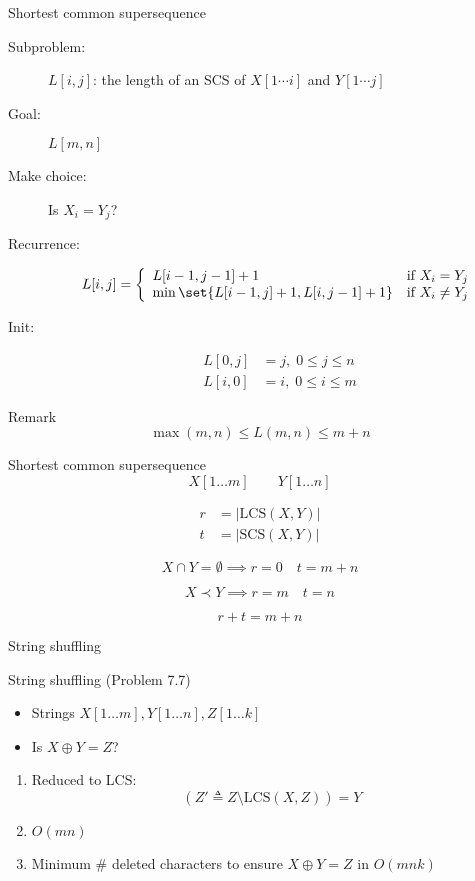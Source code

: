 \begin{frame}{Shortest common supersequence}
  \begin{description}
	\item[Subproblem:] $L[i,j]$: the length of an SCS of $X[1 \cdots i]$ and $Y[1 \cdots j]$
	\item[Goal:] $L[m,n]$
	  \pause
	\item[Make choice:] Is $X_{i} = Y_{j}$?
	\item[Recurrence:] 
	  \begin{displaymath}
		L[i,j] = \left\{ \begin{array}{ll}
		  L[i-1, j-1] + 1 & \textrm{if $X_{i} = Y_{j}$}\\
		  \min \set{L[i-1,j] + 1, L[i,j-1] + 1} & \textrm{if $X_{i} \neq Y_{j}$}
		\end{array} \right.
	  \end{displaymath}
	  \pause
	\item[Init:]
	  \begin{align*}
		L[0,j] &= j, \; 0 \le j \le n \\
		L[i,0] &= i, \; 0 \le i \le m 
	  \end{align*}
  \end{description}

  \pause
  \begin{alertblock}{Remark}
	\[
	  \max(m,n) \le L(m,n) \le m+n
	\]
  \end{alertblock}
\end{frame}
\begin{frame}{Shortest common supersequence}
  \[
	X[1 \dots m] \qquad Y[1 \dots n]
  \]

  \begin{align*}
	r &= |\text{LCS}(X,Y)| \\
	t &= |\text{SCS}(X,Y)|  
  \end{align*}

  \pause
  \[
	X \cap Y = \emptyset \implies r = 0 \quad t = m + n
  \]

  \pause
  \[ 
	X \prec Y \implies r = m \quad t = n
  \]

  \pause
  \[
	r + t = m + n
  \]
\end{frame}
\begin{frame}{String shuffling}
  \begin{exampleblock}{String shuffling (Problem 7.7)}
	\begin{itemize}
	  \item Strings $X[1 \dots m], Y[1 \dots n], Z[1 \dots k]$
	  \item Is $X \oplus Y = Z$?
	\end{itemize}

	\begin{enumerate}[(1)]
	  \item Reduced to LCS:
		\[
		  (Z' \triangleq Z \setminus \text{LCS}(X, Z)) = Y
		\]
	  \item $O(mn)$
	  \item Minimum \# deleted characters to ensure $X \oplus Y = Z$ in $O(mnk)$
	\end{enumerate}
  \end{exampleblock}
\end{frame}
